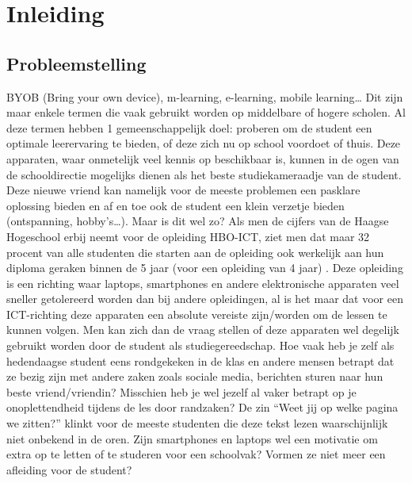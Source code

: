 
\chapter{Inleiding}
\label{ch:inleiding}

\section{Probleemstelling}
\label{sec:probleemstelling}

BYOB (Bring your own device), m-learning, e-learning, mobile learning… Dit zijn maar enkele termen die vaak gebruikt worden op middelbare of hogere scholen. Al deze termen hebben 1 gemeenschappelijk doel: proberen om de student een optimale leerervaring te bieden, of deze zich nu op school voordoet of thuis. Deze apparaten, waar onmetelijk veel kennis op beschikbaar is, kunnen in de ogen van de schooldirectie mogelijks dienen als het beste studiekameraadje van de student. Deze nieuwe vriend kan namelijk voor de meeste problemen een pasklare oplossing bieden en af en toe ook de student een klein verzetje bieden (ontspanning, hobby’s…). Maar is dit wel zo? Als men de cijfers van de Haagse Hogeschool erbij neemt voor de opleiding HBO-ICT, ziet men dat maar 32 procent van alle studenten die starten aan de opleiding ook werkelijk aan hun diploma geraken binnen de 5 jaar (voor een opleiding van 4 jaar) \autocite{Studiekeuze2017}. Deze opleiding is een richting waar laptops, smartphones en andere elektronische apparaten veel sneller getolereerd worden dan bij andere opleidingen, al is het maar dat voor een ICT-richting deze apparaten een absolute vereiste zijn/worden om de lessen te kunnen volgen. Men kan zich dan de vraag stellen of deze apparaten wel degelijk gebruikt worden door de student als studiegereedschap. Hoe vaak heb je zelf als hedendaagse student eens rondgekeken in de klas en andere mensen betrapt dat ze bezig zijn met andere zaken zoals sociale media, berichten sturen naar hun beste vriend/vriendin? Misschien heb je wel jezelf al vaker betrapt op je onoplettendheid tijdens de les door randzaken? De zin “Weet jij op welke pagina we zitten?” klinkt voor de meeste studenten die deze tekst lezen waarschijnlijk niet onbekend in de oren. Zijn smartphones en laptops wel een motivatie om extra op te letten of te studeren voor een schoolvak? Vormen ze niet meer een afleiding voor de student? 

